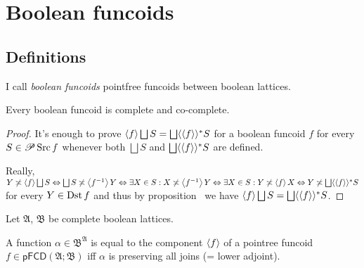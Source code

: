 \chapter{Boolean funcoids}

\section{Definitions}

I call \emph{boolean funcoids} pointfree funcoids between boolean lattices.

\begin{prop}
  Every boolean funcoid is complete and co-complete.
\end{prop}

\begin{proof}
  It's enough to prove $\supfun{f} \bigsqcup S = \bigsqcup \langle
  \supfun{f} \rangle^{\ast} S$ for a boolean funcoid $f$ for every $S
  \in \mathscr{P} \operatorname{Src} f$ whenever both $\bigsqcup S$ and $\bigsqcup
  \langle \supfun{f} \rangle^{\ast} S$ are defined.
  
  Really, $Y \nasymp \supfun{f} \bigsqcup S \Leftrightarrow \bigsqcup S
  \nasymp \supfun{f^{- 1}} Y \Leftrightarrow \exists X \in S : X
  \nasymp \supfun{f^{- 1}} Y \Leftrightarrow \exists X \in S : Y
  \nasymp \supfun{f} X \Leftrightarrow Y \nasymp \bigsqcup \langle
  \supfun{f} \rangle^{\ast} S$ for every $Y \in \operatorname{Dst} f$ and thus
  by proposition~ we have $\supfun{f} \bigsqcup S = \bigsqcup
  \langle \supfun{f} \rangle^{\ast} S$.
\end{proof}

\begin{thm}\label{bfunc-is-adj}
  Let $\mathfrak{A}$, $\mathfrak{B}$ be complete boolean lattices.
  
  A function $\alpha \in \mathfrak{B}^{\mathfrak{A}}$ is equal to the
  component $\left\langle f\right\rangle$ of a pointree funcoid $f \in \mathsf{pFCD}
  (\mathfrak{A}; \mathfrak{B})$ iff $\alpha$ is preserving all joins (= lower
  adjoint).
\end{thm}

